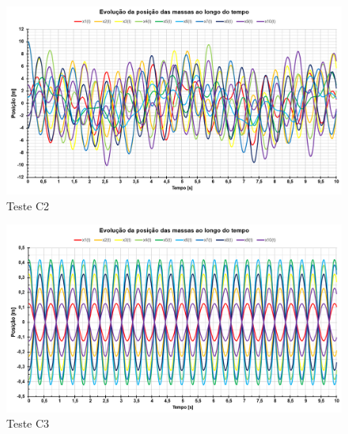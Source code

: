 \documentclass[12pt]{article} %
\begin{document}
        \begin{figure}[H]
            \centering
            \includegraphics[width=0.95\linewidth]{C2.png}
            \caption{Teste C2}
            \label{fig:C2}
        \end{figure}
        
        \begin{figure}[H]
            \centering
            \includegraphics[width=0.95\linewidth]{C3.png}
            \caption{Teste C3}
            \label{fig:C3}
        \end{figure}
\end{document}
